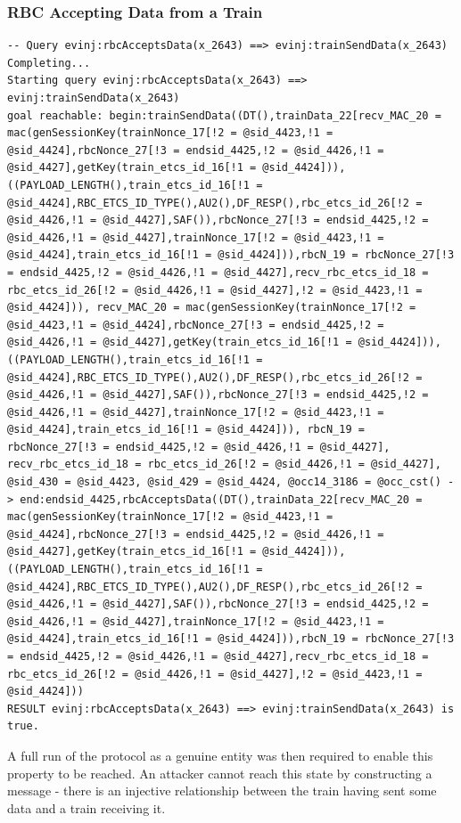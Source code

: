 \documentclass[twoside,11pt,a4paper]{article}
\begin{document}
\subsubsection{RBC Accepting Data from a Train}
\begin{lstlisting}
-- Query evinj:rbcAcceptsData(x_2643) ==> evinj:trainSendData(x_2643)
Completing...
Starting query evinj:rbcAcceptsData(x_2643) ==> evinj:trainSendData(x_2643)
goal reachable: begin:trainSendData((DT(),trainData_22[recv_MAC_20 = mac(genSessionKey(trainNonce_17[!2 = @sid_4423,!1 = @sid_4424],rbcNonce_27[!3 = endsid_4425,!2 = @sid_4426,!1 = @sid_4427],getKey(train_etcs_id_16[!1 = @sid_4424])),((PAYLOAD_LENGTH(),train_etcs_id_16[!1 = @sid_4424],RBC_ETCS_ID_TYPE(),AU2(),DF_RESP(),rbc_etcs_id_26[!2 = @sid_4426,!1 = @sid_4427],SAF()),rbcNonce_27[!3 = endsid_4425,!2 = @sid_4426,!1 = @sid_4427],trainNonce_17[!2 = @sid_4423,!1 = @sid_4424],train_etcs_id_16[!1 = @sid_4424])),rbcN_19 = rbcNonce_27[!3 = endsid_4425,!2 = @sid_4426,!1 = @sid_4427],recv_rbc_etcs_id_18 = rbc_etcs_id_26[!2 = @sid_4426,!1 = @sid_4427],!2 = @sid_4423,!1 = @sid_4424])), recv_MAC_20 = mac(genSessionKey(trainNonce_17[!2 = @sid_4423,!1 = @sid_4424],rbcNonce_27[!3 = endsid_4425,!2 = @sid_4426,!1 = @sid_4427],getKey(train_etcs_id_16[!1 = @sid_4424])),((PAYLOAD_LENGTH(),train_etcs_id_16[!1 = @sid_4424],RBC_ETCS_ID_TYPE(),AU2(),DF_RESP(),rbc_etcs_id_26[!2 = @sid_4426,!1 = @sid_4427],SAF()),rbcNonce_27[!3 = endsid_4425,!2 = @sid_4426,!1 = @sid_4427],trainNonce_17[!2 = @sid_4423,!1 = @sid_4424],train_etcs_id_16[!1 = @sid_4424])), rbcN_19 = rbcNonce_27[!3 = endsid_4425,!2 = @sid_4426,!1 = @sid_4427], recv_rbc_etcs_id_18 = rbc_etcs_id_26[!2 = @sid_4426,!1 = @sid_4427], @sid_430 = @sid_4423, @sid_429 = @sid_4424, @occ14_3186 = @occ_cst() -> end:endsid_4425,rbcAcceptsData((DT(),trainData_22[recv_MAC_20 = mac(genSessionKey(trainNonce_17[!2 = @sid_4423,!1 = @sid_4424],rbcNonce_27[!3 = endsid_4425,!2 = @sid_4426,!1 = @sid_4427],getKey(train_etcs_id_16[!1 = @sid_4424])),((PAYLOAD_LENGTH(),train_etcs_id_16[!1 = @sid_4424],RBC_ETCS_ID_TYPE(),AU2(),DF_RESP(),rbc_etcs_id_26[!2 = @sid_4426,!1 = @sid_4427],SAF()),rbcNonce_27[!3 = endsid_4425,!2 = @sid_4426,!1 = @sid_4427],trainNonce_17[!2 = @sid_4423,!1 = @sid_4424],train_etcs_id_16[!1 = @sid_4424])),rbcN_19 = rbcNonce_27[!3 = endsid_4425,!2 = @sid_4426,!1 = @sid_4427],recv_rbc_etcs_id_18 = rbc_etcs_id_26[!2 = @sid_4426,!1 = @sid_4427],!2 = @sid_4423,!1 = @sid_4424]))
RESULT evinj:rbcAcceptsData(x_2643) ==> evinj:trainSendData(x_2643) is true.
\end{lstlisting}
A full run of the protocol as a genuine entity was then required to enable this property to be reached. An attacker cannot reach this state by constructing a message - there is an injective relationship between the train having sent some data and a train receiving it.\\
\end{document}
